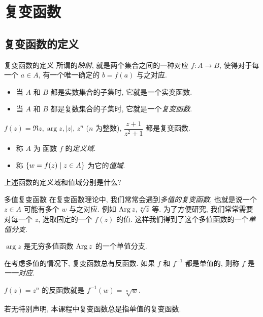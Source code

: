 \section{复变函数}

\subsection{复变函数的定义}
\begin{frame}{复变函数的定义}
	\onslide<+->
	所谓的\emph{映射}, 就是两个集合之间的一种对应 $f:A\to B$, 使得对于每一个 $a\in A$, 有一个唯一确定的 $b=f(a)$ 与之对应.
	\begin{itemize}
		\item 当 $A$ 和 $B$ 都是实数集合的子集时, 它就是一个实变函数.
		\item 当 $A$ 和 $B$ 都是复数集合的子集时, 它就是一个\emph{复变函数}.
	\end{itemize}

	\onslide<+->
	\begin{example}
		$f(z)=\Re z,\arg z,|z|$, $z^n$ ($n$ 为整数), $\dfrac{z+1}{z^2+1}$ 都是复变函数.
	\end{example}

	\onslide<+->
	\begin{definition}
		\begin{itemize}
			\item 称 $A$ 为 函数 $f$ 的\emph{定义域}.
			\item 称 ${\left\{w=f(z)\mid z\in A\right\}}$ 为它的\emph{值域}.
		\end{itemize} 
	\end{definition}
	\onslide<+->
	上述函数的定义域和值域分别是什么?
\end{frame}


\begin{frame}{多值复变函数}
	\onslide<+->
	在复变函数理论中, 我们常常会遇到\emph{多值的复变函数}, 也就是说一个 $z\in A$ 可能有多个 $w$ 与之对应.
	\onslide<+->
	例如 $\operatorname{Arg} z,\sqrt[n]z$ 等.
	\onslide<+->
	为了方便研究, 我们常常需要对每一个 $z$, 选取固定的一个 $f(z)$ 的值.
	\onslide<+->
	这样我们得到了这个多值函数的一个\emph{单值分支}.
	\onslide<+->
	\begin{example}
		$\arg z$ 是无穷多值函数 $\operatorname{Arg} z$ 的一个单值分支.
	\end{example}

	\onslide<+->
	在考虑多值的情况下, 复变函数总有反函数.
	\onslide<+->
	如果 $f$ 和 $f^{-1}$ 都是单值的, 则称 $f$ 是\emph{一一对应}.
	\onslide<+->
	\begin{example}
		$f(z)=z^n$ 的反函数就是 $f^{-1}(w)=\sqrt[n]{w}$.
		\onslide<+->{%
			当 $n=\pm1$ 时, $f$ 是一一对应.
		}
	\end{example}

	\onslide<+->
	若无特别声明, 本课程中\alert{复变函数总是指单值的复变函数}.
\end{frame}


